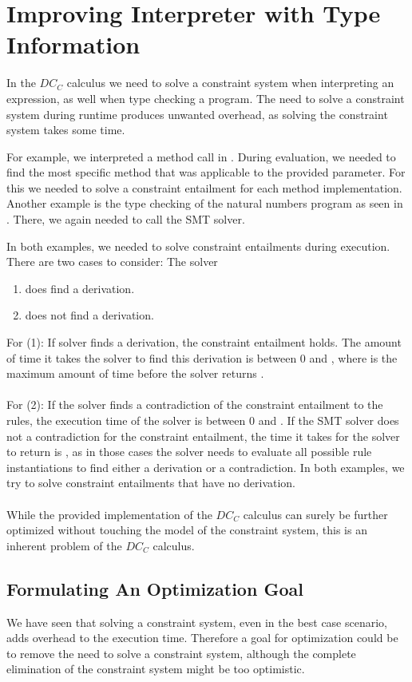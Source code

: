\chapter{Improving Interpreter with Type Information}
In the $DC_C$ calculus we need to solve a constraint system
when interpreting an expression, as well when type checking a program.
The need to solve a constraint system during runtime produces unwanted overhead,
as solving the constraint system takes some time.

For example, we interpreted a method call in .
During evaluation, we needed to find the most specific method
that was applicable to the provided parameter.
For this we needed to solve a constraint entailment
for each method implementation.
Another example is the type checking of the natural numbers program
as seen in .
There, we again needed to call the SMT solver.

In both examples, we needed to solve constraint entailments during execution.
There are two cases to consider: The solver
\begin{enumerate}
  \item does find a derivation.
  \item does not find a derivation.
\end{enumerate}
For (1):
If solver finds a derivation,
the constraint entailment holds.
The amount of time it takes the solver to find this derivation
is between $0$ and ,
where  is the maximum amount of time before the solver returns .\\
\\
For (2):
If the solver finds a contradiction of the constraint entailment to the rules,
the execution time of the solver is between $0$ and .
If the SMT solver does not a contradiction for the constraint entailment,
the time it takes for the solver to return is ,
as in those cases the solver needs to evaluate all possible rule instantiations
to find either a derivation or a contradiction.
In both examples, we try to solve constraint entailments that have no derivation.\\
\\
While the provided implementation of the $DC_C$ calculus
can surely be further optimized without
touching the model of the constraint system,
this is an inherent problem of the $DC_C$ calculus.

\section{Formulating An Optimization Goal} %
\label{sec:goal}
We have seen that solving a constraint system,
even in the best case scenario,
adds overhead to the execution time.
Therefore a goal for optimization could be
to remove the need to solve a constraint system,
although the complete elimination of the constraint system
might be too optimistic.

